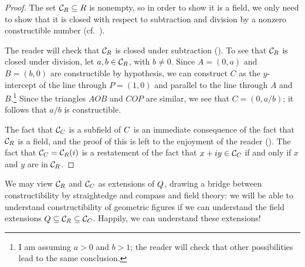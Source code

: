 \begin{proof}
  The set $\mathcal{C}_{R} \subseteq R$ is nonempty, so in order to
  show it is a field, we only need to show that it is closed with
  respect to subtraction and division by a nonzero constructible
  number (cf.\ ).

  The reader will check that $\mathcal{C}_{R}$ is closed under
  subtraction
  (). To
  see that $\mathcal{C}_{R}$ is closed under division, let
  $a, b \in \mathcal{C}_{R}$, with $b \neq 0$. Since $A = (0, a)$ and
  $B = (b, 0)$ are constructible by hypothesis, we can construct $C$
  as the $y$-intercept of the line through $P = (1, 0)$ and parallel
  to the line through $A$ and $B$.\footnote{I am assuming $a > 0$ and
    $b > 1$; the reader will check that other possibilities lead to
    the same conclusion.} Since the triangles $AOB$ and $COP$ are
  similar, we see that $C = (0, a/b)$; it follows that $a/b$ is
  constructible.

  The fact that $\mathcal{C}_{C}$ is a subfield of $C$ is an
  immediate consequence of the fact that $\mathcal{C}_{R}$ is a
  field, and the proof of this is left to the enjoyment of the reader
  (). The
  fact that $\mathcal{C}_{C} = \mathcal{C}_{R}(i)$ is a restatement
  of the fact that $x + iy \in \mathcal{C}_{C}$ if and only if $x$
  and $y$ are in $\mathcal{C}_{R}$.
\end{proof}
We may view $\mathcal{C}_{R}$ and $\mathcal{C}_{C}$ as extensions of
$Q$, drawing a bridge between constructibility by straightedge and
compass and field theory: we will be able to understand
constructibility of geometric figures if we can understand the field
extensions $Q \subseteq \mathcal{C}_{R} \subseteq
\mathcal{C}_{C}$. Happily, we can understand these extensions!

